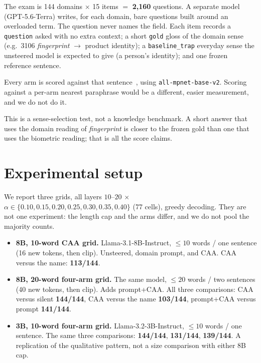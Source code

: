 \documentclass{article} %
\begin{document}
The exam is 144 domains $\times$ 15 items $=$ \textbf{2{,}160} questions.
A separate model (GPT-5.6-Terra) writes, for each domain, bare questions built around an overloaded term.
The question never names the field.
Each item records a \texttt{question} asked with no extra context; a short \texttt{gold} gloss of the domain sense (e.g.\ 3106 \emph{fingerprint} $\to$ product identity); a \texttt{baseline\_trap} everyday sense the unsteered model is expected to give (a person's identity); and one frozen reference sentence.

Every arm is scored against that sentence~\citep{song2020mpnet}, using \texttt{all-mpnet-base-v2}.
Scoring against a per-arm nearest paraphrase would be a different, easier measurement, and we do not do it.

This is a sense-selection test, not a knowledge benchmark.
A short answer that uses the domain reading of \emph{fingerprint} is closer to the frozen gold than one that uses the biometric reading; that is all the score claims.

\section{Experimental setup}
\label{sec:setup}

We report three grids, all layers $10$--$20$ $\times$ $\alpha \in \{0.10, 0.15, 0.20, 0.25, 0.30, 0.35, 0.40\}$ (77 cells), greedy decoding.
They are not one experiment: the length cap and the arms differ, and we do not pool the majority counts.

\begin{itemize}
\item \textbf{8B, 10-word CAA grid.} Llama-3.1-8B-Instruct, $\leq 10$ words / one sentence (16 new tokens, then clip). Unsteered, domain prompt, and CAA. CAA versus the name: \textbf{113/144}.
\item \textbf{8B, 20-word four-arm grid.} The same model, $\leq 20$ words / two sentences (40 new tokens, then clip). Adds prompt+CAA. All three comparisons: CAA versus silent \textbf{144/144}, CAA versus the name \textbf{103/144}, prompt+CAA versus prompt \textbf{141/144}.
\item \textbf{3B, 10-word four-arm grid.} Llama-3.2-3B-Instruct, $\leq 10$ words / one sentence. The same three comparisons: \textbf{144/144}, \textbf{131/144}, \textbf{139/144}. A replication of the qualitative pattern, not a size comparison with either 8B cap.
\end{itemize}
\end{document}
